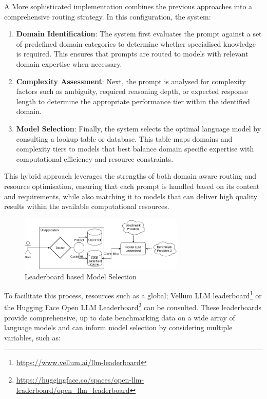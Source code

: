 A More sophisticated implementation combines the previous approaches into a comprehensive routing strategy. In this configuration, the system:

\begin{enumerate}
    \item \textbf{Domain Identification}: The system first evaluates the prompt against a set of predefined domain categories to determine whether specialised knowledge is required. This ensures that prompts are routed to models with relevant domain expertise when necessary.
    \item \textbf{Complexity Assessment}: Next, the prompt is analysed for complexity factors such as ambiguity, required reasoning depth, or expected response length to determine the appropriate performance tier within the identified domain.
    \item \textbf{Model Selection}: Finally, the system selects the optimal language model by consulting a lookup table or database. This table maps domains and complexity tiers to models that best balance domain specific expertise with computational efficiency and resource constraints.
\end{enumerate}

This hybrid approach leverages the strengths of both domain aware routing and resource optimisation, ensuring that each prompt is handled based on its content and requirements, while also matching it to models that can deliver high quality results within the available computational resources.

\begin{figure}[H]
    \centering
    \includegraphics[width=0.7\textwidth]{figures/user-dig.drawio.png}
    \caption{Leaderboard based Model Selection}
    \label{fig:user_digram}
\end{figure}

To facilitate this process, resources such as a global; Vellum LLM leaderboard\footnote{\url{https://www.vellum.ai/llm-leaderboard}} or the Hugging Face Open LLM Leaderboard\footnote{\url{https://huggingface.co/spaces/open-llm-leaderboard/open_llm_leaderboard}} can be consulted. These leaderboards provide comprehensive, up to date benchmarking data on a wide array of language models and can inform model selection by considering multiple variables, such as:

